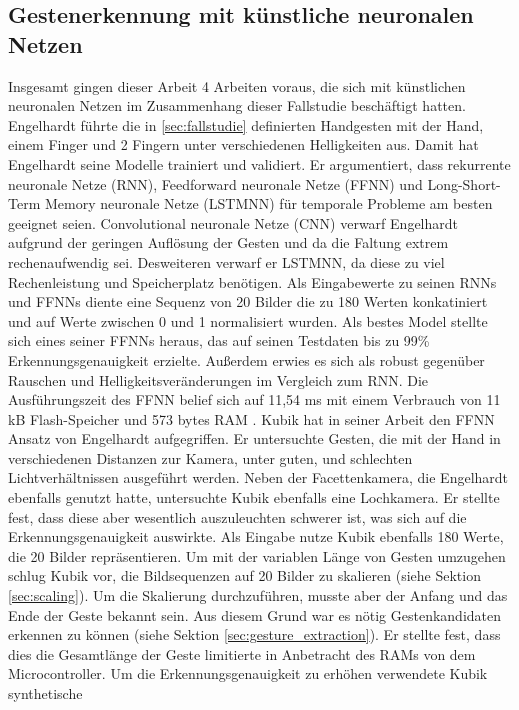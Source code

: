 \subsection{Gestenerkennung mit künstliche neuronalen Netzen}
Insgesamt gingen dieser Arbeit 4 Arbeiten voraus, die sich mit künstlichen neuronalen Netzen im Zusammenhang dieser Fallstudie beschäftigt hatten.
\newline
\newline
Engelhardt führte die in \ref{sec:fallstudie} definierten Handgesten mit der Hand, einem Finger und 2 Fingern unter verschiedenen Helligkeiten aus. Damit hat Engelhardt seine Modelle trainiert und validiert. Er
argumentiert, dass rekurrente neuronale Netze (RNN), Feedforward neuronale Netze (FFNN) und Long-Short-Term Memory neuronale Netze (LSTMNN) für temporale Probleme am besten geeignet seien. Convolutional neuronale
Netze (CNN) verwarf Engelhardt aufgrund der geringen Auflösung der Gesten und da die Faltung extrem rechenaufwendig sei. Desweiteren verwarf er LSTMNN, da diese zu viel Rechenleistung und Speicherplatz
benötigen. Als Eingabewerte zu seinen RNNs und FFNNs diente eine Sequenz von 20 Bilder die zu 180 Werten konkatiniert und auf Werte zwischen 0 und 1 normalisiert wurden. Als bestes Model stellte sich eines
seiner FFNNs heraus, das auf seinen Testdaten bis zu 99\% Erkennungsgenauigkeit erzielte. Außerdem erwies es sich als robust gegenüber Rauschen und Helligkeitsveränderungen im Vergleich zum RNN. Die Ausführungszeit
des FFNN belief sich auf 11,54 ms mit einem Verbrauch von 11 kB Flash-Speicher und 573 bytes RAM \cite{engelhardtThesis}.
\newline
\newline
Kubik hat in seiner Arbeit den FFNN Ansatz von Engelhardt aufgegriffen. Er untersuchte Gesten, die mit der Hand in verschiedenen Distanzen zur Kamera, unter guten, und schlechten Lichtverhältnissen ausgeführt werden.
Neben der Facettenkamera, die Engelhardt ebenfalls genutzt hatte, untersuchte Kubik ebenfalls eine Lochkamera. Er stellte fest, dass diese aber wesentlich auszuleuchten schwerer ist, was sich auf die
Erkennungsgenauigkeit auswirkte. Als Eingabe nutze Kubik ebenfalls 180 Werte, die 20 Bilder repräsentieren. Um mit der variablen Länge von Gesten umzugehen schlug Kubik vor, die Bildsequenzen auf 20 Bilder zu
skalieren (siehe Sektion \ref{sec:scaling}). Um die Skalierung durchzuführen, musste aber der Anfang und das Ende der Geste bekannt sein. Aus diesem Grund war es nötig Gestenkandidaten erkennen zu können (siehe
Sektion \ref{sec:gesture_extraction}). Er stellte fest, dass dies die Gesamtlänge der Geste limitierte in Anbetracht des RAMs von dem Microcontroller. Um die Erkennungsgenauigkeit zu erhöhen verwendete Kubik synthetische
